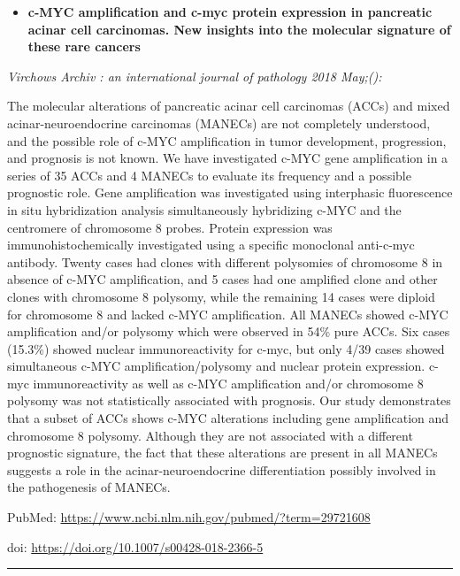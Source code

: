 \documentclass[]{article}
\providecommand{\tightlist}{%
  \setlength{\itemsep}{0pt}\setlength{\parskip}{0pt}}
\begin{document}
\begin{itemize}
\tightlist
\item
  \textbf{c-MYC amplification and c-myc protein expression in pancreatic
  acinar cell carcinomas. New insights into the molecular signature of
  these rare cancers}
\end{itemize}

\emph{Virchows Archiv : an international journal of pathology 2018
May;():}

The molecular alterations of pancreatic acinar cell carcinomas (ACCs)
and mixed acinar-neuroendocrine carcinomas (MANECs) are not completely
understood, and the possible role of c-MYC amplification in tumor
development, progression, and prognosis is not known. We have
investigated c-MYC gene amplification in a series of 35 ACCs and 4
MANECs to evaluate its frequency and a possible prognostic role. Gene
amplification was investigated using interphasic fluorescence in situ
hybridization analysis simultaneously hybridizing c-MYC and the
centromere of chromosome 8 probes. Protein expression was
immunohistochemically investigated using a specific monoclonal
anti-c-myc antibody. Twenty cases had clones with different polysomies
of chromosome 8 in absence of c-MYC amplification, and 5 cases had one
amplified clone and other clones with chromosome 8 polysomy, while the
remaining 14 cases were diploid for chromosome 8 and lacked c-MYC
amplification. All MANECs showed c-MYC amplification and/or polysomy
which were observed in 54\% pure ACCs. Six cases (15.3\%) showed nuclear
immunoreactivity for c-myc, but only 4/39 cases showed simultaneous
c-MYC amplification/polysomy and nuclear protein expression. c-myc
immunoreactivity as well as c-MYC amplification and/or chromosome 8
polysomy was not statistically associated with prognosis. Our study
demonstrates that a subset of ACCs shows c-MYC alterations including
gene amplification and chromosome 8 polysomy. Although they are not
associated with a different prognostic signature, the fact that these
alterations are present in all MANECs suggests a role in the
acinar-neuroendocrine differentiation possibly involved in the
pathogenesis of MANECs.

PubMed: \url{https://www.ncbi.nlm.nih.gov/pubmed/?term=29721608}

doi: \url{https://doi.org/10.1007/s00428-018-2366-5}

{}

{}

\begin{center}\rule{0.5\linewidth}{\linethickness}\end{center}
\end{document}

